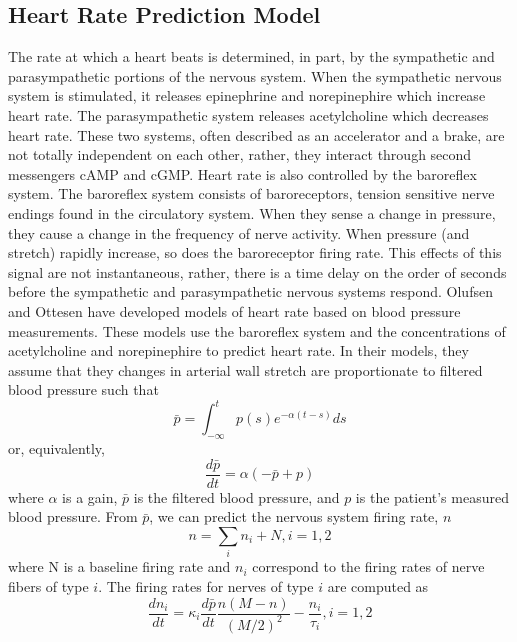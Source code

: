 \documentclass[12pt]{article}
\begin{document}
\subsection*{Heart Rate Prediction Model}
The rate at which a heart beats is determined, in part, by the sympathetic and parasympathetic portions of the nervous system. When the sympathetic nervous system is stimulated, it releases epinephrine and norepinephire  which increase heart rate. The parasympathetic system releases acetylcholine which decreases heart rate.  These two systems, often described as an accelerator and a brake, are not totally independent on each other, rather, they interact through second messengers cAMP and cGMP. \citep{olshansky2008parasympathetic}
Heart rate is also controlled by the baroreflex system. The baroreflex system consists of baroreceptors, tension sensitive nerve endings found in the circulatory system. \citep{ottesen1997modelling} When they sense a change in pressure, they cause a change in the frequency of nerve activity. When pressure (and stretch) rapidly increase, so does the baroreceptor firing rate. \citep{negative1999reflexes} This effects of this signal are not instantaneous, rather, there is a time delay on the order of seconds before the sympathetic and parasympathetic nervous systems respond. \citep{ottesen1997modelling}
Olufsen and Ottesen have developed models of heart rate based on blood pressure measurements.\citep{olufsen2013practical} These models use the baroreflex system and the concentrations of acetylcholine and norepinephire to predict heart rate. In their models, they assume that they changes in arterial wall stretch are proportionate to filtered blood pressure such that
\begin{equation}
\bar p = \int_{-\infty}^{t} p(s)e^{-\alpha(t-s)}ds
\end{equation}
or, equivalently, 
\begin{equation}
\frac{d \bar p}{dt} = \alpha(-\bar p + p)
\end{equation}
where $\alpha$ is a gain, $\bar p$ is the filtered blood pressure, and $p$ is the patient's measured blood pressure. 
From $\bar p$, we can predict the nervous system firing rate, $n$
\begin{equation}
n = \sum_i n_i + N, i = 1,2
\end{equation}
where N is a baseline firing rate and $n_i$ correspond to the firing rates of nerve fibers of type $i$. The firing rates for nerves of type $i$ are computed as
\begin{equation}
\frac{dn_i}{dt} = \kappa_i \frac{d \bar p}{dt} \frac{n(M-n)}{(M/2)^2}-\frac{n_i}{\tau_i}, i = 1,2
\end{equation}
\end{document}
